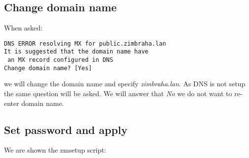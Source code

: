 \subsection {Change domain name}
When asked:
\begin{verbatim}
DNS ERROR resolving MX for public.zimbraha.lan
It is suggested that the domain name have
 an MX record configured in DNS
Change domain name? [Yes] 
\end{verbatim}
we will change the domain name and specify \textit{zimbraha.lan}. As DNS is not setup the same question will be asked. We will answer that \textit{No} we do not want to re-enter domain name.

\subsection {Set password and apply}
We are shown the zmsetup script:
